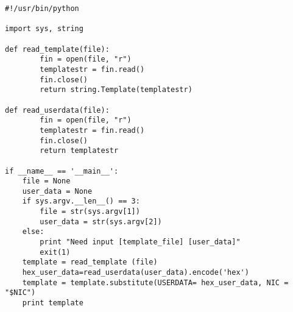 \documentclass[a4paper,10pt]{article}
\begin{document}
\begin{Verbatim}[frame=single]
#!/usr/bin/python

import sys, string

def read_template(file):
        fin = open(file, "r")
        templatestr = fin.read()
        fin.close()        
        return string.Template(templatestr)

def read_userdata(file):
        fin = open(file, "r")
        templatestr = fin.read()
        fin.close()        
        return templatestr

if __name__ == '__main__':
    file = None
    user_data = None
    if sys.argv.__len__() == 3:
        file = str(sys.argv[1])
        user_data = str(sys.argv[2])
    else:
        print "Need input [template_file] [user_data]"
        exit(1)
    template = read_template (file)
    hex_user_data=read_userdata(user_data).encode('hex')    
    template = template.substitute(USERDATA= hex_user_data, NIC = "$NIC")
    print template
\end{Verbatim}

\newpage

\vspace{4mm}

\begin{thebibliography}{99}

\end{thebibliography}
\end{document}
